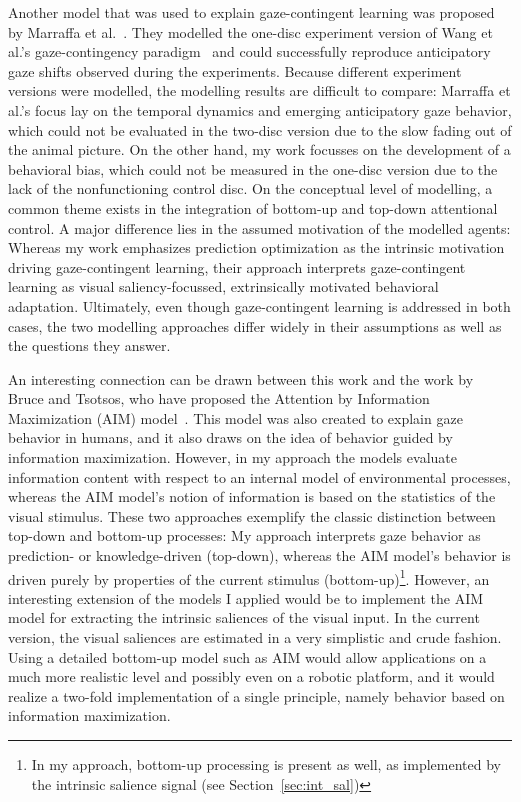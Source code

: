 \documentclass[a4paper]{scrreprt}
\begin{document}
Another model that was used to explain gaze-contingent learning was proposed by Marraffa et al.~\cite{marraffa12}. They modelled the one-disc experiment version of Wang et al.'s gaze-contingency paradigm~\cite{wang12} and could successfully reproduce anticipatory gaze shifts observed during the experiments. Because different experiment versions were modelled, the modelling results are difficult to compare: Marraffa et al.'s focus lay on the temporal dynamics and emerging anticipatory gaze behavior, which could not be evaluated in the two-disc version due to the slow fading out of the animal picture. On the other hand, my work focusses on the development of a behavioral bias, which could not be measured in the one-disc version due to the lack of the nonfunctioning control disc. On the conceptual level of modelling, a common theme exists in the integration of bottom-up and top-down attentional control. A major difference lies in the assumed motivation of the modelled agents: Whereas my work emphasizes prediction optimization as the intrinsic motivation driving gaze-contingent learning, their approach interprets gaze-contingent learning as visual saliency-focussed, extrinsically motivated behavioral adaptation. Ultimately, even though gaze-contingent learning is addressed in both cases, the two modelling approaches differ widely in their assumptions as well as the questions they answer.

An interesting connection can be drawn between this work and the work by Bruce and Tsotsos, who have proposed the Attention by Information Maximization (AIM) model~\cite{bruce07}. This model was also created to explain gaze behavior in humans, and it also draws on the idea of behavior guided by information maximization. However, in my approach the models evaluate information content with respect to an internal model of environmental processes, whereas the AIM model's notion of information is based on the statistics of the visual stimulus. These two approaches exemplify the classic distinction between top-down and bottom-up processes: My approach interprets gaze behavior as prediction- or knowledge-driven (top-down), whereas the AIM model's behavior is driven purely by properties of the current stimulus (bottom-up)\footnote{In my approach, bottom-up processing is present as well, as implemented by the intrinsic salience signal (see Section~\ref{sec:int_sal})}. However, an interesting extension of the models I applied would be to implement the AIM model for extracting the intrinsic saliences of the visual input. In the current version, the visual saliences are estimated in a very simplistic and crude fashion. Using a detailed bottom-up model such as AIM would allow applications on a much more realistic level and possibly even on a robotic platform, and it would realize a two-fold implementation of a single principle, namely behavior based on information maximization.




\listoffigures





\end{document}

